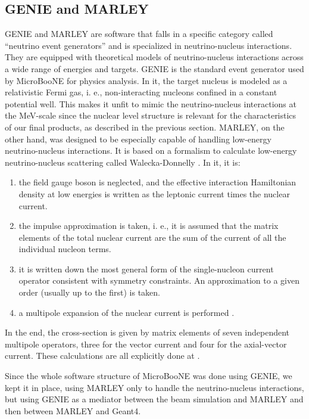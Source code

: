 \subsection{GENIE and MARLEY}
GENIE and MARLEY are software that falls in a specific category called ``neutrino event generators” and is specialized in neutrino-nucleus interactions. They are equipped with theoretical models of neutrino-nucleus interactions across a wide range of energies and targets. 
GENIE is the standard event generator used by MicroBooNE for physics analysis. In it, the target nucleus is modeled as a relativistic Fermi gas, i. e., non-interacting nucleons confined in a constant potential well. This makes it unfit to mimic the neutrino-nucleus interactions at the MeV-scale since the nuclear level structure is relevant for the characteristics of our final products, as described in the previous section. 
MARLEY, on the other hand, was designed to be especially capable of handling low-energy neutrino-nucleus interactions. It is based on a formalism to calculate low-energy neutrino-nucleus scattering called Walecka-Donnelly \cite{Walecka-Donnelly}. In it, it is:
\begin{enumerate}
 \item the field gauge boson is neglected, and the effective interaction Hamiltonian density at low energies is written as the leptonic current times the nuclear current.
 \item the impulse approximation is taken, i. e., it is assumed that the matrix elements of the total nuclear current are the sum of the current of all the individual nucleon terms.
 \item it is written down the most general form of the single-nucleon current operator consistent with symmetry constraints. An approximation to a given order (usually up to the first) is taken.
 \item a multipole expansion of the nuclear current is performed \cite{Gardiner_thesis}. 
\end{enumerate}

In the end, the cross-section is given by matrix elements of seven independent multipole operators, three for the vector current and four for the axial-vector current. These calculations are all explicitly done at \cite{Gardiner_thesis}.

Since the whole software structure of MicroBooNE was done using GENIE, we kept it in place, using MARLEY only to handle the neutrino-nucleus interactions, but using GENIE as a mediator between the beam simulation and MARLEY and then between MARLEY and Geant4. 


